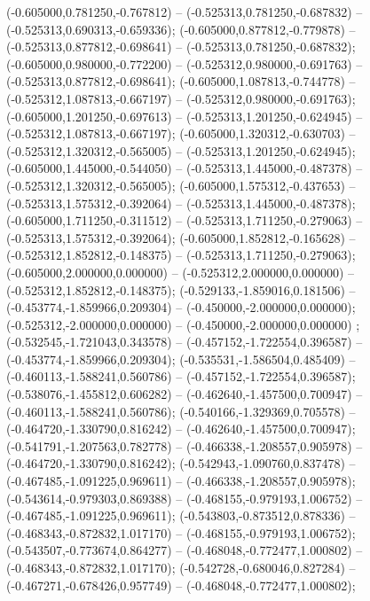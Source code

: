  (-0.605000,0.781250,-0.767812) -- (-0.525313,0.781250,-0.687832) -- (-0.525313,0.690313,-0.659336);
 (-0.605000,0.877812,-0.779878) -- (-0.525313,0.877812,-0.698641) -- (-0.525313,0.781250,-0.687832);
 (-0.605000,0.980000,-0.772200) -- (-0.525312,0.980000,-0.691763) -- (-0.525313,0.877812,-0.698641);
 (-0.605000,1.087813,-0.744778) -- (-0.525312,1.087813,-0.667197) -- (-0.525312,0.980000,-0.691763);
 (-0.605000,1.201250,-0.697613) -- (-0.525313,1.201250,-0.624945) -- (-0.525312,1.087813,-0.667197);
 (-0.605000,1.320312,-0.630703) -- (-0.525312,1.320312,-0.565005) -- (-0.525313,1.201250,-0.624945);
 (-0.605000,1.445000,-0.544050) -- (-0.525313,1.445000,-0.487378) -- (-0.525312,1.320312,-0.565005);
 (-0.605000,1.575312,-0.437653) -- (-0.525313,1.575312,-0.392064) -- (-0.525313,1.445000,-0.487378);
 (-0.605000,1.711250,-0.311512) -- (-0.525313,1.711250,-0.279063) -- (-0.525313,1.575312,-0.392064);
 (-0.605000,1.852812,-0.165628) -- (-0.525312,1.852812,-0.148375) -- (-0.525313,1.711250,-0.279063);
 (-0.605000,2.000000,0.000000) -- (-0.525312,2.000000,0.000000) -- (-0.525312,1.852812,-0.148375);
 (-0.529133,-1.859016,0.181506) -- (-0.453774,-1.859966,0.209304) -- (-0.450000,-2.000000,0.000000);
 (-0.525312,-2.000000,0.000000) -- (-0.450000,-2.000000,0.000000) ;
 (-0.532545,-1.721043,0.343578) -- (-0.457152,-1.722554,0.396587) -- (-0.453774,-1.859966,0.209304);
 (-0.535531,-1.586504,0.485409) -- (-0.460113,-1.588241,0.560786) -- (-0.457152,-1.722554,0.396587);
 (-0.538076,-1.455812,0.606282) -- (-0.462640,-1.457500,0.700947) -- (-0.460113,-1.588241,0.560786);
 (-0.540166,-1.329369,0.705578) -- (-0.464720,-1.330790,0.816242) -- (-0.462640,-1.457500,0.700947);
 (-0.541791,-1.207563,0.782778) -- (-0.466338,-1.208557,0.905978) -- (-0.464720,-1.330790,0.816242);
 (-0.542943,-1.090760,0.837478) -- (-0.467485,-1.091225,0.969611) -- (-0.466338,-1.208557,0.905978);
 (-0.543614,-0.979303,0.869388) -- (-0.468155,-0.979193,1.006752) -- (-0.467485,-1.091225,0.969611);
 (-0.543803,-0.873512,0.878336) -- (-0.468343,-0.872832,1.017170) -- (-0.468155,-0.979193,1.006752);
 (-0.543507,-0.773674,0.864277) -- (-0.468048,-0.772477,1.000802) -- (-0.468343,-0.872832,1.017170);
 (-0.542728,-0.680046,0.827284) -- (-0.467271,-0.678426,0.957749) -- (-0.468048,-0.772477,1.000802);
